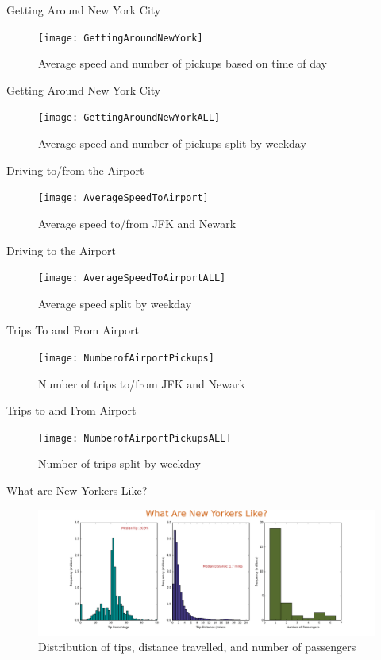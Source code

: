 \documentclass[11pt,tightenlines,nofootinbib,superscriptaddress,notitlepage, APS, pra]{beamer}
\theoremstyle{definition}
\theoremstyle{plain}
\begin{document}
\begin{frame}{Getting Around New York City}
\begin{figure}
\centering
\texttt{[image: GettingAroundNewYork]}
\caption{Average speed and number of pickups based on time of day}
\end{figure}
\end{frame}

\begin{frame}{Getting Around New York City}
\begin{figure}
\centering
\texttt{[image: GettingAroundNewYorkALL]}
\caption{Average speed and number of pickups split by weekday}
\end{figure}
\end{frame}

\begin{frame}{Driving to/from the Airport}
\begin{figure}
\centering
\texttt{[image: AverageSpeedToAirport]}
\caption{Average speed to/from JFK and Newark}
\end{figure}
\end{frame}

\begin{frame}{Driving to the Airport}
\begin{figure}
\centering
\texttt{[image: AverageSpeedToAirportALL]}
\caption{Average speed split by weekday}
\end{figure}
\end{frame}

\begin{frame}{Trips To and From Airport}
\begin{figure}
\centering
\texttt{[image: NumberofAirportPickups]}
\caption{Number of trips to/from JFK and Newark} 
\end{figure}
\end{frame}

\begin{frame}{Trips to and From Airport}
\begin{figure}
\centering
\texttt{[image: NumberofAirportPickupsALL]}
\caption{Number of trips split by weekday}
\end{figure}
\end{frame}

\begin{frame}{What are New Yorkers Like?}
\begin{figure}
\centering
\includegraphics[scale=0.225]{newyorkers}
\caption{Distribution of tips, distance travelled, and number of passengers} 
\end{figure}
\end{frame}
\end{document}
